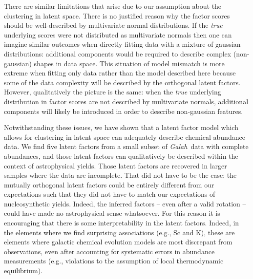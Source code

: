 \documentclass[twocolumn]{aastex62}
\newcommand{\project}[1]{\textsl{#1}}
\newcommand{\Galah}{\project{Galah}}
\begin{document}
There are similar limitations that arise due to our assumption about the clustering in latent space.
There is no justified reason why the factor scores should be well-described by multivariate normal
distributions. If the \emph{true} underlying scores were not distributed as multivariate normals
then one can imagine similar outcomes when directly fitting data with a mixture of gaussian distributions:
additional components would be required to describe complex (non-gaussian) shapes in data space. 
This situation of model mismatch is more extreme when fitting only data rather than the model
described here because some of the data complexity will be described by the orthogonal latent
factors. However, qualitatively the picture is the same: when the \emph{true} underlying distribution
in factor scores are not described by multivariate normals, additional components will likely be
introduced in order to describe non-gaussian features.




Notwithstanding these issues, we have shown that a latent factor model which allows for clustering in latent space can adequately
describe chemical abundance data. 
We find five latent factors from a small subset of \Galah\ data with complete abundances, and
those latent factors can qualitatively be described within the context of astrophysical yields. 
Those latent factors are recovered in larger samples where the data are incomplete.
That did not have to be the case: the mutually orthogonal latent factors could be entirely 
different from our expectations such that they did not have to match our expectations of
nucleosynthetic yields. Indeed, the inferred factors -- even after a
valid rotation -- could have made no astrophysical sense whatsoever. For this reason it
is encouraging that there is some interpretability in the latent factors. Indeed, in the elements where we find surprising associations (e.g., Sc and K), these are elements where galactic chemical evolution models are most discrepant from observations, even after accounting for systematic errors in abundance measurements (e.g., violations to the assumption of local thermodynamic equilibrium).
\end{document}
